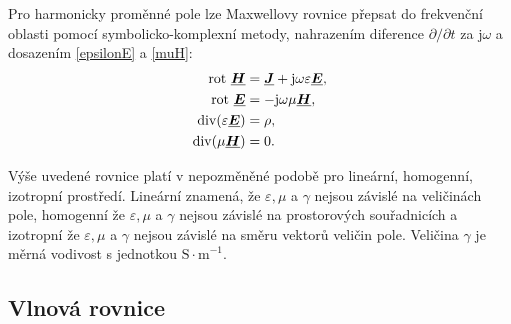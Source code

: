 \documentclass[12pt,a4paper,oneside]{article}
\numberwithin{equation}{section} %
\numberwithin{figure}{section} %
\numberwithin{table}{section} %
\newcommand{\mj}{\mathrm{j}} %
\renewcommand{\vec}[1]{\mbox{\boldmath$#1$}} %
\newcommand{\faz}[1]{{\underline{#1}}} %
\newcommand{\rot}{\mathrm{rot}\ }
\begin{document}
Pro harmonicky proměnné pole lze Maxwellovy rovnice přepsat do frekvenční oblasti pomocí symbolicko-komplexní metody, nahrazením diference $\partial / \partial t$ za $\mj \omega$ a dosazením \ref{epsilonE} a \ref{muH}:
\begin{subequations}
\begin{align}
\label{max1fharm}
\rot \faz{\vec{H}} &= \faz{\vec{J}} + \mj \omega \varepsilon \faz{\vec{E}},
\\
\label{max2fharm}
\rot \faz{\vec{E}} &= - \mj \omega \mu \faz{\vec{H}},
\\
\udiv (\varepsilon \faz{\vec{E}}) &= \rho,
\\
\udiv (\mu \faz{\vec{H}}) &= 0.
\end{align}
\end{subequations}

Výše uvedené rovnice platí v nepozměněné podobě pro lineární, homogenní, izotropní prostředí. Lineární znamená, že $\varepsilon , \mu$ a $\gamma$ nejsou závislé na veličinách pole, homogenní že $\varepsilon , \mu$ a $\gamma$ nejsou závislé na prostorových souřadnicích a izotropní že $\varepsilon , \mu$ a $\gamma$ nejsou závislé na směru vektorů veličin pole. Veličina $\gamma$ je měrná vodivost s jednotkou $\mathrm{S \cdot m} ^{-1}$. \cite{MayerTeorie}


\subsection{Vlnová rovnice}
\end{document}
